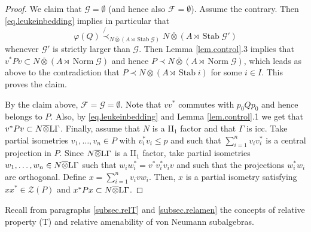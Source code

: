 \documentclass[a4paper,11pt]{amsart}
\numberwithin{equation}{section}
\begin{document}
\begin{proof}
We claim that ${\mathcal{G}} = \emptyset$ (and hence also ${\mathcal{F}} = \emptyset$). Assume the contrary. Then \eqref{eq.leukeinbedding} implies in particular that
$${\varphi}(Q) \not{\prec}_{N {\mathbin{\overline{\otimes}}} (A \rtimes {\operatorname{Stab}} {\mathcal{G}})} N {\mathbin{\overline{\otimes}}} (A \rtimes {\operatorname{Stab}} {\mathcal{G}}')$$
whenever ${\mathcal{G}}'$ is strictly larger than ${\mathcal{G}}$. Then Lemma \ref{lem.control}.3 implies that $v^* P v \subset N {\mathbin{\overline{\otimes}}} (A \rtimes {\operatorname{Norm}} {\mathcal{G}})$ and hence $P {\prec} N {\mathbin{\overline{\otimes}}} (A \rtimes {\operatorname{Norm}} {\mathcal{G}})$, which leads as above to the contradiction that $P {\prec} N {\mathbin{\overline{\otimes}}} (A \rtimes {\operatorname{Stab}} i)$ for some $i \in I$. This proves the claim.

By the claim above, ${\mathcal{F}} = {\mathcal{G}} = \emptyset$. Note that $vv^*$ commutes with $p_0 Q p_0$ and hence belongs to $P$. Also, by \eqref{eq.leukeinbedding} and Lemma \ref{lem.control}.1 we get that $v^* P v \subset N {\mathbin{\overline{\otimes}}} {\mathord{\text{\rm L}}} \Gamma$. Finally, assume that $N$ is a II$_1$ factor and that $\Gamma$ is icc. Take partial isometries $v_1,\ldots,v_n \in P$ with $v_i^* v_i {\leqslant} p$ and such that $\sum_{i=1}^n v_i v_i^*$ is a central projection in $P$. Since $N {\mathbin{\overline{\otimes}}} {\mathord{\text{\rm L}}} \Gamma$ is a II$_1$ factor, take partial isometries $w_1,\ldots,w_n \in N {\mathbin{\overline{\otimes}}} {\mathord{\text{\rm L}}} \Gamma$ such that $w_i w_i^* = v^* v_i^* v_i v$ and such that the projections $w_i^* w_i$ are orthogonal. Define $x = \sum_{i=1}^n v_i v w_i$. Then, $x$ is a partial isometry satisfying $xx^* \in {\mathcal{Z}}(P)$ and $x^* P x \subset N {\mathbin{\overline{\otimes}}} {\mathord{\text{\rm L}}} \Gamma$.
\end{proof}

Recall from paragraphs \ref{subsec.relT} and \ref{subsec.relamen} the concepts of relative property (T) and relative amenability of von Neumann subalgebras.
\end{document}
